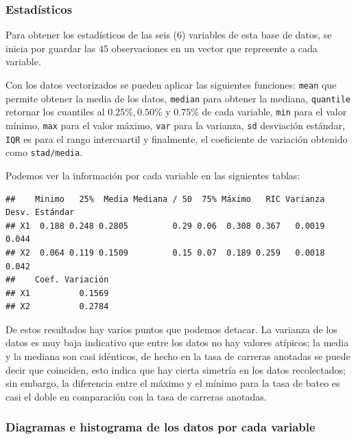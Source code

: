 \documentclass{staprojteamusb}
\begin{document}
 \hypertarget{estaduxedsticos}{%
 \subsubsection{Estadísticos}\label{estaduxedsticos}}

 Para obtener los estadísticos de las seis (6) variables de esta base de
 datos, se inicia por guardar las \(45\) observaciones en un vector que
 represente a cada variable.

 Con los datos vectorizados se pueden aplicar las siguientes funciones:
 \texttt{mean} que permite obtener la media de los datos,
 \texttt{median} para obtener la mediana, \texttt{quantile} retornar los
 cuantiles al \(0.25\%, 0.50\%\) y \(0.75\%\) de cada variable,
 \texttt{min} para el valor mínimo, \texttt{max} para el valor máximo,
 \texttt{var} para la varianza, \texttt{sd} desviación estándar,
 \texttt{IQR} es para el rango intercuartil y finalmente, el coeficiente
 de variación obtenido como \texttt{stad/media}.

 Podemos ver la información por cada variable en las siguientes tablas:

\begin{verbatim}
##    Minimo   25%  Media Mediana / 50  75% Máximo   RIC Varianza Desv. Estándar
## X1  0.188 0.248 0.2805         0.29 0.06  0.308 0.367   0.0019          0.044
## X2  0.064 0.119 0.1509         0.15 0.07  0.189 0.259   0.0018          0.042
##    Coef. Variación
## X1          0.1569
## X2          0.2784
\end{verbatim}

 De estos resultados hay varios puntos que podemos detacar. La varianza
 de los datos es muy baja indicativo que entre los datos no hay valores
 atípicos; la media y la mediana son casi idénticos, de hecho en la tasa
 de carreras anotadas se puede decir que coinciden, esto indica que hay
 cierta simetría en los datos recolectados; sin embargo, la diferencia
 entre el máximo y el mínimo para la tasa de bateo es casi el doble en
 comparación con la tasa de carreras anotadas.

 \hypertarget{diagramas-e-histograma-de-los-datos-por-cada-variable}{%
 \subsubsection{Diagramas e histograma de los datos por cada
 variable}\label{diagramas-e-histograma-de-los-datos-por-cada-variable}}
\end{document}
